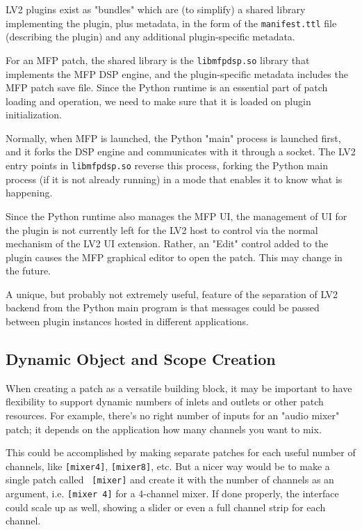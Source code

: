 \documentclass[a4paper]{article}
\def\:{\hskip0pt}
\begin{document}
LV2 plugins exist as "bundles" which are (to simplify) a shared
library implementing the plugin, plus metadata, in the form of
the {\tt manifest.ttl} file (describing the plugin) and any
additional plugin\:-\:specific metadata.

For an MFP patch, the shared library is the {\tt libmfpdsp.so}
library that implements the MFP DSP engine, and the
plugin\:-\:specific metadata includes the MFP patch save file. Since
the Python runtime is an essential part of patch loading and
operation, we need to make sure that it is loaded on plugin
initialization.

Normally, when MFP is launched, the Python "main" process is
launched first, and it forks the DSP engine and communicates with
it through a socket. The LV2 entry points in {\tt libmfpdsp.so}
reverse this process, forking the Python main process (if it is
not already running) in a mode that enables it to know what is
happening.

Since the Python runtime also manages the MFP UI, the management
of UI for the plugin is not currently left for the LV2 host to
control via the normal mechanism of the LV2 UI extension. Rather,
an "Edit" control added to the plugin causes the MFP graphical editor to
open the patch. This may change in the future.

A unique, but probably not extremely useful, feature of the
separation of LV2 backend from the Python main program is that
messages could be passed between plugin instances hosted in
different applications.


\subsection{Dynamic Object and Scope Creation}

When creating a patch as a versatile building block, it may be
important to have flexibility to support dynamic numbers of
inlets and outlets or other patch resources. For example, there's
no right number of inputs for an "audio mixer" patch; it depends
on the application how many channels you want to mix.

This could be accomplished by making separate patches for each
useful number of channels, like {\tt [mixer4]}, {\tt [mixer8]},
etc. But a nicer way would be to make a single patch called {\tt
[mixer]} and create it with the number of channels as an
argument, i.e. {\tt [mixer 4]} for a 4-channel mixer. If done
properly, the interface could scale up as well, showing a slider
or even a full channel strip for each channel.
\end{document}

